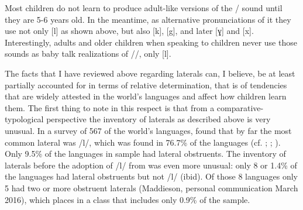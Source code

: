 \documentclass[output=paper]{langsci/langscibook}
\begin{document}
Most children do not learn to produce adult-like versions of the {\gL}/{\kL} sound until they are 5-6 years old. In the meantime, as alternative pronunciations of it they use not only [l] as shown above, but also [k], [g], and later [ɣ] and [x]. Interestingly, adults and older children when speaking to children never use those sounds as baby talk realizations of /{\gL}/, only [l].

The facts that I have reviewed above regarding  laterals can, I believe, be at least partially accounted for in terms of relative determination, that is of tendencies that are widely attested in the world’s languages and affect how children learn them. The first thing to note in this respect is that from a comparative-typological perspective the  inventory of laterals as described above is very unusual. In a survey of 567 of the world’s languages, \citet{MaddiesonLateralConsonants2013} found that by far the most common lateral was /l/, which was found in 76.7\% of the languages (cf. \citealt[153--154]{Ladefoged2001}; \citealt{Ladefoged1977}; \citealt{Ladefoged1996}). Only 9.5\% of the languages in  sample had lateral obstruents. The inventory of  laterals before the adoption of /l/ from  was even more unusual: only 8 or 1.4\% of the languages had lateral obstruents but not /l/ (ibid). Of those 8 languages only 5 had two or more obstruent laterals (Maddieson, personal communication March 2016), which places  in a class that includes only 0.9\% of the sample. 
\end{document}
